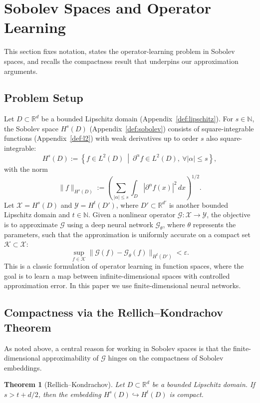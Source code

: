 \documentclass[11pt]{article}
\theoremstyle{plain}
\newtheorem{theorem}{Theorem}
\theoremstyle{definition}
\theoremstyle{remark}
\begin{document}
\section{Sobolev Spaces and Operator Learning}
This section fixes notation, states the operator-learning problem in Sobolev spaces, and recalls the compactness result that underpins our approximation
arguments.

\subsection{Problem Setup}
Let $D \subset \mathbb{R}^d$ be a bounded Lipschitz domain
(Appendix~\ref{def:lipschitz}). For $s \in \mathbb{N}$, the Sobolev space $H^s(D)$ (Appendix~\ref{def:sobolev}) consists of square-integrable functions (Appendix~\ref{def:l2}) with weak derivatives up to order $s$ also
square-integrable:
\[
H^s(D) := \left\{ f \in L^2(D) \ \middle| \ \partial^\alpha f \in L^2(D),
\ \forall |\alpha| \leq s \right\},
\]
with the norm
\[
\|f\|_{H^s(D)} := \left( \sum_{|\alpha| \leq s} \int_D
|\partial^\alpha f(x)|^2 \, dx \right)^{1/2}.
\]
Let $\mathcal{X} = H^s(D)$ and $\mathcal{Y} = H^t(D')$, where
$D' \subset \mathbb{R}^{d'}$ is another bounded Lipschitz domain and $t \in \mathbb{N}$. Given a nonlinear operator $\mathcal{G}: \mathcal{X} \to \mathcal{Y}$, the objective is to approximate $\mathcal{G}$ using a deep neural network $\mathcal{G}_\theta$, where $\theta$ represents the parameters, such that the approximation is uniformly accurate on a compact set $\mathcal{K} \subset \mathcal{X}$:
\[
\sup_{f \in \mathcal{K}} \| \mathcal{G}(f) - \mathcal{G}_\theta(f)
\|_{H^t(D')} < \varepsilon.
\]
This is a classic formulation of operator learning in function spaces, where the goal is to learn a map between infinite-dimensional spaces with controlled approximation error. In this paper we use finite-dimensional neural networks.

\subsection{Compactness via the Rellich--Kondrachov Theorem}
As noted above, a central reason for working in Sobolev spaces is that the finite-dimensional approximability of $\mathcal{G}$ hinges on the compactness of Sobolev embeddings.

\begin{theorem}[Rellich--Kondrachov]
\label{thm:rellich}
Let $D \subset \mathbb{R}^d$ be a bounded Lipschitz domain. If
$s > t + d/2$, then the embedding $H^s(D) \hookrightarrow H^t(D)$ is compact.
\end{theorem}
\end{document}

